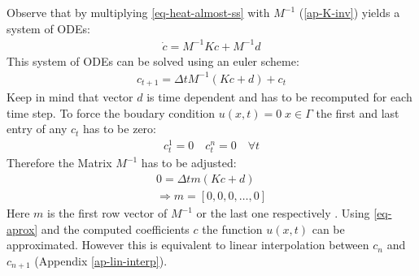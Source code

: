 Observe that by multiplying \ref{eq-heat-almost-ss} with \(M^{-1}\) (\ref{ap-K-inv}) yields a system of ODEs:
\begin{gather}
\dot{c} = M^{-1}Kc + M^{-1}d
\end{gather}
This system of ODEs can be solved using an euler scheme:
\begin{gather}
c_{t+1} = \Delta t M^{-1}(Kc + d) + c_{t}
\end{gather}
Keep in mind that vector \(d\) is time dependent and has to be recomputed for each time step.
To force the boudary condition \(u(x, t) = 0 \; x \in \Gamma\) the first and last entry of any \(c_{t}\) has to be zero:
\begin{gather}
c_{t}^{1} = 0 \quad c_{t}^{n} = 0 \quad \forall t
\end{gather}
Therefore the Matrix \(M^{-1}\) has to be adjusted:
\begin{gather}
0 = \Delta t m (Kc + d) \\
\Rightarrow m = [0, 0, 0, \dots , 0] 
\end{gather}
Here \(m\) is the first row vector of \(M^{-1}\) or the last one respectively \cite{Gustafsson2011b}.
Using \ref{eq-aprox} and the computed coefficients \(c\) the function \(u(x,t)\) can be approximated.
However this is equivalent to linear interpolation between \(c_{n}\) and \(c_{n+1}\) (Appendix \ref{ap-lin-interp}).